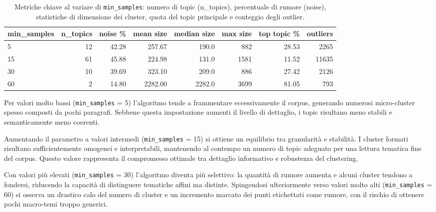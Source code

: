 \begin{table}[H]
\centering
\footnotesize
\begin{tabular}{lrrrrrrr}
\hline
min\_samples & n\_topics & noise \% & mean size & median size & max size & top topic \% & outliers \\
\hline
5  & 12 & 42.28 & 257.67 & 190.0 & 882  & 28.53  & 2265 \\
15 & 61 & 45.88 & 224.98 & 131.0 & 1581 & 11.52 & 11635 \\
30 & 10 & 39.69 & 323.10 & 209.0 & 886  & 27.42  & 2126 \\
60 & 2  & 14.80 & 2282.00 & 2282.0 & 3699 & 81.05  & 793  \\
\hline
\end{tabular}
\caption{Metriche chiave al variare di \texttt{min\_samples}: numero di topic (n\_topics), percentuale di rumore (noise), statistiche di dimensione dei cluster, quota del topic principale e conteggio degli outlier.}
\label{tab:min-samples-summary}
\end{table}
Per valori molto bassi (\texttt{min\_samples} = 5) l'algoritmo tende a frammentare eccessivamente il corpus, generando numerosi micro-cluster spesso composti da pochi paragrafi. 
Sebbene questa impostazione aumenti il livello di dettaglio, i topic risultano meno stabili e semanticamente meno coerenti.

Aumentando il parametro a valori intermedi (\texttt{min\_samples} = 15) si ottiene un equilibrio tra granularità e stabilità. 
I cluster formati risultano sufficientemente omogenei e interpretabili, mantenendo al contempo un numero di topic adeguato per una lettura tematica fine del corpus. 
Questo valore rappresenta il compromesso ottimale tra dettaglio informativo e robustezza del clustering.

Con valori più elevati (\texttt{min\_samples} = 30) l’algoritmo diventa più selettivo: la quantità di rumore aumenta e alcuni cluster tendono a fondersi, riducendo la capacità di distinguere tematiche affini ma distinte. 
Spingendosi ulteriormente verso valori molto alti (\texttt{min\_samples} = 60) si osserva un drastico calo del numero di cluster e un incremento marcato dei punti etichettati come rumore, con il rischio di ottenere pochi macro-temi troppo generici.


